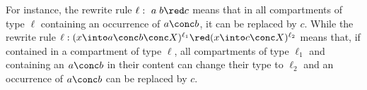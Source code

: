 \begin{comment}
A \emph{rewrite rule} is a pair $(\LeftPat,\RightPat)$, denoted by $\srewRule{\LeftPat}{\RightPat}{}$, where $\LeftPat= (\overline{a} \conc x \into
\overline{b} \conc \overline{\LeftPat}\conc X)^\ell$ is a pattern and  $\RightPat$ is a compartment of the same type of $\LeftPat$ such that the variables occurring in it are a subset of the variables occurring in $\LeftPat$.
The application of a rule $\LeftPat \red \RightPat$ to a term
$\ov{t}$ is performed in the following way: 1) Find (if it exists) a compartment $\ov{u}$ in $\ov{t}$ and a substitution $\sigma$ of variables by ground terms
such that $\ov{u} = \sigma(\LeftPat)$; and 2) Replace in $\ov{t}$ the subterm $\ov{u}$ with $\sigma(\RightPat)$. We write  $\ov{t} \red \ov{t'}$ if
$\ov{t'}$ is obtained  by applying a rewrite rule to  $\ov{t}$.

 A rewrite rule $\srewRule{\LeftPat}{\RightPat}{}$ then states that a compartment $\sigma(\LeftPat)$,
obtained by instantiating variables in $\LeftPat$ by some instantiation function $\sigma$, can be transformed into the compartment $\sigma(\RightPat)$
with the same label of $\LeftPat$. Linearity is not required in the r.h.s. of a rule, thus allowing duplication.

In many cases rules involve only the content of a compartment. We therefore introduce the following notation:
$$\ell: \overline{a} \conc \overline{\LeftPat}  \srew{}   \ov{o}$$
 as a short for
 $\wr{x}{\overline{a} \conc \overline{\LeftPat}\conc X}{\ell}   \srew{}  \wr{x}{ \ov{o}  \conc X }{\ell} $
where $x$ and $X$ are canonically chosen variables not occurring in $\overline{\LeftPat}$ and $\overline{o}$.


For instance, the rewrite rule
  $\ell:~a \; b \red c$
means that in all compartments of type $\ell$ an occurrence of $a \conc b$  can be replaced by $c$ (the implicit variable $x$ matches with the whole membrane
and the implicit variable $X$ matches with all the remaining part of the compartment content).
\end{comment}


For instance, the rewrite rule
  $\ell:~a \; b \red c$
means that in all compartments of type $\ell$ containing an occurrence of $a \conc b$, it can be replaced by $c$. While the rewrite rule  $\ell: (x \into a \conc b \conc X)^{\ell_1} \red ( x \into c \conc X)^{\ell_2}$ means that, if contained in a compartment of type $\ell$, all compartments of type $\ell_1$ and containing an $a \conc b$ in their content can change their type to $\ell_2$ and an occurrence of $a \conc b$  can be replaced by $c$.


